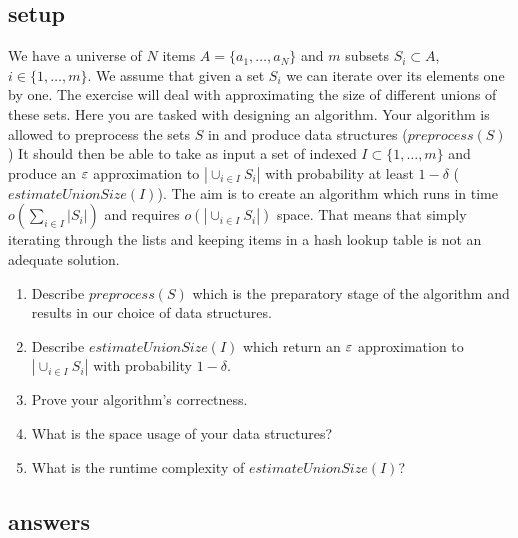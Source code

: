 \subsection*{setup}
We have a universe of $N$ items $A = \{a_1,\ldots, a_N\}$
and $m$ subsets $S_i \subset A$, $i \in \{1,\ldots,m\}$.
We assume that given a set $S_i$ we can iterate over its elements one by one.
The exercise will deal with approximating the size of different unions of these sets.  
Here you are tasked with designing an algorithm. 
Your algorithm is allowed to preprocess the sets $S$ in and produce data structures ($preprocess(S)$)
It should then be able to take as input a set of indexed $I \subset \{1,\ldots,m\}$ and produce
an $\varepsilon$ approximation to $|\cup_{i \in I}S_i|$ with probability at least $1-\delta$ ($estimateUnionSize(I)$).
The aim is to create an algorithm which runs in time $o(\sum_{i \in I}|S_i|)$ and requires $o(|\cup_{i \in I}S_i|)$ space. 
That means that simply iterating through the lists and keeping items in a hash lookup table is not an adequate solution. 

\begin{enumerate}
\item Describe $preprocess(S)$ which is the preparatory stage of the algorithm and results in our choice of data structures.
\item Describe $estimateUnionSize(I)$ which return an $\varepsilon$ approximation to $|\cup_{i \in I}S_i|$ with probability $1-\delta$.
\item Prove your algorithm's correctness.
\item What is the space usage of your data structures?
\item What is the runtime complexity of $estimateUnionSize(I)$?
\end{enumerate}


\pagebreak


\subsection*{answers}

